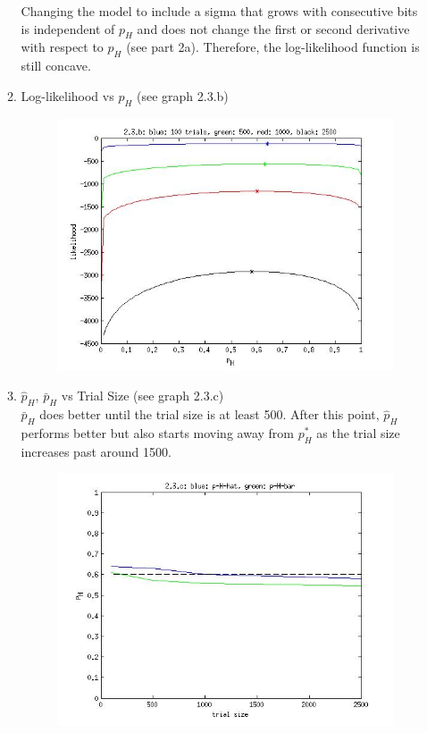 \documentclass{article}
\begin{document}
\begin{enumerate}
\begin{enumerate}
		Changing the model to include a sigma that grows with consecutive bits is independent of $p_H$ and does not change the first or second derivative with respect to $p_H$ (see part 2a). Therefore, the log-likelihood function is still concave.
		\item Log-likelihood vs $p_H$ (see graph 2.3.b)
		\begin{figure}[h]
		\includegraphics[scale=0.75]{hw2_ques2_3_b}
		\end{figure}
		\item $\hat{p}_H$, $\bar{p}_H$ vs Trial Size (see graph 2.3.c)\\
		$\bar{p}_H$ does better until the trial size is at least 500. After this point, $\hat{p}_H$ performs better but also starts moving away from $p_H^*$ as the trial size increases past around 1500.
		\begin{figure}[h]
		\includegraphics[scale=0.75]{hw2_ques2_3_c}
		\end{figure}
		\end{enumerate}
\end{enumerate}
\end{document}
